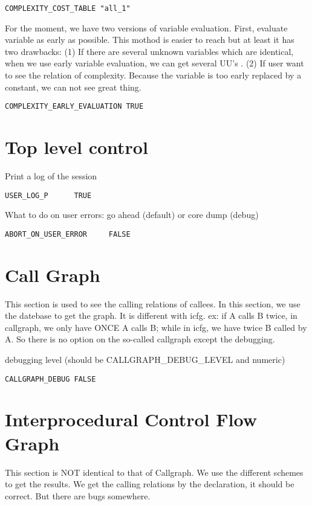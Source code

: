 \begin{verbatim}
COMPLEXITY_COST_TABLE "all_1"
\end{verbatim}

For the moment, we have two versions of variable evaluation. First,
evaluate variable as early as possible. This mothod is easier to reach
but at least it has two drawbacks: (1) If there are several unknown
variables which are identical, when we use early variable evaluation, we
can get several UU's . (2) If user want to see the relation of
complexity. Because the variable is too early replaced by a constant, we
can not see great thing.

\begin{verbatim}
COMPLEXITY_EARLY_EVALUATION TRUE
\end{verbatim}

\section{Top level control}

Print a log of the session

\begin{verbatim}
USER_LOG_P      TRUE
\end{verbatim}

What to do on user errors: go ahead (default) or core dump (debug)

\begin{verbatim}
ABORT_ON_USER_ERROR     FALSE
\end{verbatim}

\section{Call Graph}
This section is used to see the calling relations of callees.
In this section,
we use the datebase to get the graph. It is different with icfg.
ex: if A calls B twice, in callgraph, we only have ONCE A calls B;
while in icfg, we have twice B called by A.
So there is no option on the so-called callgraph except the debugging.

debugging level (should be CALLGRAPH_DEBUG_LEVEL and numeric)

\begin{verbatim}
CALLGRAPH_DEBUG FALSE
\end{verbatim}

\section{Interprocedural Control Flow Graph}
This section is NOT identical to that of Callgraph. 
We use the different schemes to get the results.
We get the calling relations by the declaration, it should be correct.
But there are bugs somewhere.

